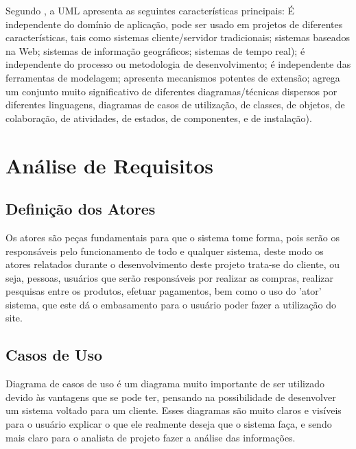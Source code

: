Segundo \cite{Alberto}, a UML apresenta as seguintes características principais:
É independente do domínio de aplicação, pode ser usado em projetos de diferentes características, tais como sistemas cliente/servidor tradicionais; sistemas baseados na Web; sistemas de informação geográficos; sistemas de tempo real); é independente do processo ou metodologia de desenvolvimento; é independente das ferramentas de modelagem; apresenta mecanismos potentes de extensão; agrega um conjunto muito significativo de diferentes diagramas/técnicas dispersos por diferentes linguagens, diagramas de casos de utilização, de classes, de objetos, de colaboração, de atividades, de estados, de componentes, e de instalação). 

\section{Análise de Requisitos}
\label{sec:anareq}
\subsection{Definição dos Atores}
\label{sec:defatores}
Os atores são peças fundamentais para que o sistema tome forma, pois serão os responsáveis pelo funcionamento de todo e qualquer sistema, deste modo os atores relatados durante o desenvolvimento deste projeto trata-se do cliente, ou seja, pessoas, usuários que serão responsáveis por realizar as compras, realizar pesquisas entre os produtos, efetuar pagamentos, bem como o uso do 'ator' sistema, que este dá o embasamento para o usuário poder fazer a utilização do site.

\subsection{Casos de Uso}
\label{sec:casuso}
Diagrama de casos de uso é um diagrama muito importante de ser utilizado devido às vantagens que se pode ter, pensando na possibilidade de desenvolver um sistema voltado para um cliente. Esses diagramas são muito claros e visíveis para o usuário explicar o que ele realmente deseja que o sistema faça, e sendo mais claro para o analista de projeto fazer a análise das informações.


